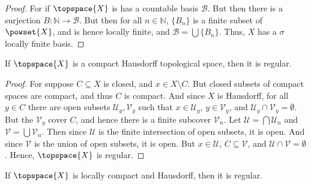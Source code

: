 \documentclass{article}                                                        %
\begin{document}
        \begin{proof}
            For if $\topspace{X}$ is has a countable basis $\mathcal{B}$. But
            then there is a surjection $B:\mathbb{N}\rightarrow\mathcal{B}$.
            But then for all $n\in\mathbb{N}$, $\{B_{n}\}$ is a finite subset
            of $\powset{X}$, and is hence locally finite, and
            $\mathcal{B}=\bigcup\{B_{n}\}$. Thus, $X$ has a $\sigma$ locally
            finite basis.
        \end{proof}
        \begin{theorem}
            \label{thm:Compact_Hausdorff_is_Regular}%
            If $\topspace{X}$ is a compact Hausdorff topological space, then it
            is regular.
        \end{theorem}
        \begin{proof}
            For suppose $C\subseteq{X}$ is closed, and $x\in{X}\setminus{C}$.
            But closed subsets of compact spaces are compact, and thus $C$ is
            compact. And since $X$ is Hausdorff, for all $y\in{C}$ there are
            open subsets $\mathcal{U}_{y},\mathcal{V}_{y}$ such that
            $x\in\mathcal{U}_{y}$, $y\in\mathcal{V}_{y}$, and
            $\mathcal{U}_{y}\cap\mathcal{V}_{y}=\emptyset$. But the
            $\mathcal{V}_{y}$ cover $C$, and hence there is a finite subcover
            $\mathcal{V}_{n}$. Let $\mathcal{U}=\bigcap\mathcal{U}_{n}$ and
            $\mathcal{V}=\bigcup\mathcal{V}_{n}$. Then since
            $\mathcal{U}$ is the finite intersection of open subsets, it is
            open. And since $\mathcal{V}$ is the union of open subsets, it is
            open. But $x\in\mathcal{U}$, $C\subseteq\mathcal{V}$, and
            $\mathcal{U}\cap\mathcal{V}=\emptyset$. Hence, $\topspace{X}$ is
            regular.
        \end{proof}
        \begin{theorem}
            \label{thm:Loc_Comp_and_Hausdorff_is_Regular}%
            If $\topspace{X}$ is locally compact and Hausdorff, then it is
            regular.
        \end{theorem}
\end{document}
